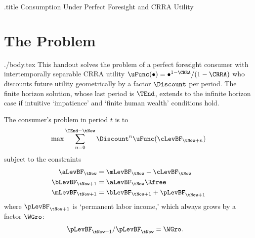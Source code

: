 \documentclass{handout}
\begin{document}
\handoutHeader

\begin{verbatimwrite}{\jobname.title}
Consumption Under Perfect Foresight and CRRA Utility
\end{verbatimwrite}

\handoutNameMake

\section{The Problem}

\begin{verbatimwrite}{./body.tex}
This handout solves the problem of a perfect foresight consumer with intertemporally separable CRRA utility
$\uFunc(\bullet)= \bullet^{1-\CRRA}/(1-\CRRA)$ who discounts future utility
geometrically by a factor $\Discount$ per period.  The finite horizon
solution, whose last period is $\TEnd$, extends to the infinite horizon case if 
intuitive `impatience' and `finite human wealth' conditions hold.

The consumer's problem in period $t$ is to
\begin{equation}
\max \sum_{n=0}^{\TEnd-\tNow} \Discount^{n} \uFunc(\cLevBF_{\tNow+n})                \label{eq:maxprob}
\end{equation}
subject to the constraints 
\begin{equation}\begin{gathered}\begin{aligned}
      \aLevBF_{\tNow}   & =  \mLevBF_{\tNow}-\cLevBF_{\tNow}
\\    \bLevBF_{\tNow+1} & =  \aLevBF_{\tNow}\Rfree
\\    \mLevBF_{\tNow+1} & =  \bLevBF_{\tNow+1}+\pLevBF_{\tNow+1}
\end{aligned}\end{gathered}\end{equation}
where $\pLevBF_{\tNow+1}$ is `permanent labor income,' which always grows by a factor $\WGro$:
\begin{equation}\begin{gathered}\begin{aligned}
        \pLevBF_{\tNow+1}/\pLevBF_{\tNow} & =  {\WGro}.
\end{aligned}\end{gathered}\end{equation}


\end{verbatimwrite}
\end{document}
